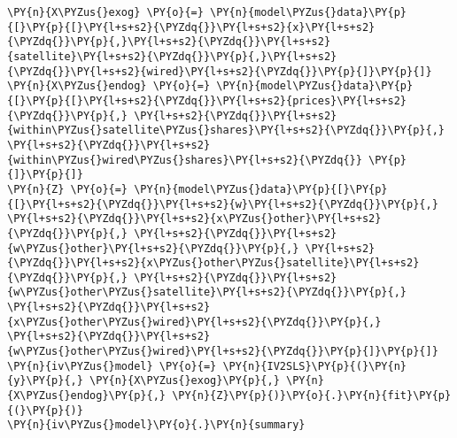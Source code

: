 \begin{tcolorbox}[breakable, size=fbox, boxrule=1pt, pad at break*=1mm,colback=cellbackground, colframe=cellborder]
\begin{Verbatim}[commandchars=\\\{\}]
\PY{n}{X\PYZus{}exog} \PY{o}{=} \PY{n}{model\PYZus{}data}\PY{p}{[}\PY{p}{[}\PY{l+s+s2}{\PYZdq{}}\PY{l+s+s2}{x}\PY{l+s+s2}{\PYZdq{}}\PY{p}{,}\PY{l+s+s2}{\PYZdq{}}\PY{l+s+s2}{satellite}\PY{l+s+s2}{\PYZdq{}}\PY{p}{,}\PY{l+s+s2}{\PYZdq{}}\PY{l+s+s2}{wired}\PY{l+s+s2}{\PYZdq{}}\PY{p}{]}\PY{p}{]}
\PY{n}{X\PYZus{}endog} \PY{o}{=} \PY{n}{model\PYZus{}data}\PY{p}{[}\PY{p}{[}\PY{l+s+s2}{\PYZdq{}}\PY{l+s+s2}{prices}\PY{l+s+s2}{\PYZdq{}}\PY{p}{,} \PY{l+s+s2}{\PYZdq{}}\PY{l+s+s2}{within\PYZus{}satellite\PYZus{}shares}\PY{l+s+s2}{\PYZdq{}}\PY{p}{,} \PY{l+s+s2}{\PYZdq{}}\PY{l+s+s2}{within\PYZus{}wired\PYZus{}shares}\PY{l+s+s2}{\PYZdq{}} \PY{p}{]}\PY{p}{]}
\PY{n}{Z} \PY{o}{=} \PY{n}{model\PYZus{}data}\PY{p}{[}\PY{p}{[}\PY{l+s+s2}{\PYZdq{}}\PY{l+s+s2}{w}\PY{l+s+s2}{\PYZdq{}}\PY{p}{,} \PY{l+s+s2}{\PYZdq{}}\PY{l+s+s2}{x\PYZus{}other}\PY{l+s+s2}{\PYZdq{}}\PY{p}{,} \PY{l+s+s2}{\PYZdq{}}\PY{l+s+s2}{w\PYZus{}other}\PY{l+s+s2}{\PYZdq{}}\PY{p}{,} \PY{l+s+s2}{\PYZdq{}}\PY{l+s+s2}{x\PYZus{}other\PYZus{}satellite}\PY{l+s+s2}{\PYZdq{}}\PY{p}{,} \PY{l+s+s2}{\PYZdq{}}\PY{l+s+s2}{w\PYZus{}other\PYZus{}satellite}\PY{l+s+s2}{\PYZdq{}}\PY{p}{,} \PY{l+s+s2}{\PYZdq{}}\PY{l+s+s2}{x\PYZus{}other\PYZus{}wired}\PY{l+s+s2}{\PYZdq{}}\PY{p}{,} \PY{l+s+s2}{\PYZdq{}}\PY{l+s+s2}{w\PYZus{}other\PYZus{}wired}\PY{l+s+s2}{\PYZdq{}}\PY{p}{]}\PY{p}{]}
\PY{n}{iv\PYZus{}model} \PY{o}{=} \PY{n}{IV2SLS}\PY{p}{(}\PY{n}{y}\PY{p}{,} \PY{n}{X\PYZus{}exog}\PY{p}{,} \PY{n}{X\PYZus{}endog}\PY{p}{,} \PY{n}{Z}\PY{p}{)}\PY{o}{.}\PY{n}{fit}\PY{p}{(}\PY{p}{)}
\PY{n}{iv\PYZus{}model}\PY{o}{.}\PY{n}{summary}
\end{Verbatim}
\end{tcolorbox}

